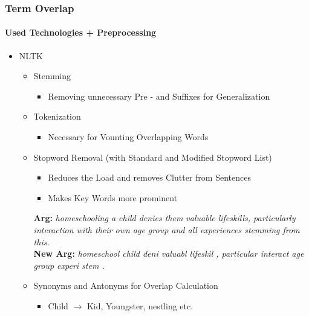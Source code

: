 \documentclass[english,handout]{mlutalk}
\begin{document}
\begin{frame}
  \frametitle{Term Overlap}
  \framesubtitle{Used Technologies + Preprocessing}
    \begin{itemize}
      \item NLTK 
        \begin{itemize}
          \item Stemming
          \begin{itemize}
            \item Removing unnecessary Pre - and Suffixes for Generalization
          \end{itemize}
          \item Tokenization
          \begin{itemize}
            \item Necessary for Vounting Overlapping Words
          \end{itemize}
          \item Stopword Removal (with Standard and Modified Stopword List)
          \begin{itemize}
            \item Reduces the Load and removes Clutter from Sentences
            \item Makes Key Words more prominent
          \end{itemize}
          
          \begin{example}
            \textbf{Arg:} \textit{homeschooling a child denies them valuable lifeskills, particularly interaction with their own age group and all experiences stemming from this.}\\
            \textbf{New Arg:} \textit{homeschool child deni valuabl lifeskil , particular interact age group experi stem .}
          \end{example}

          \item Synonyms and Antonyms for Overlap Calculation
          \begin{itemize}
            \item Child $\rightarrow$ Kid, Youngster, nestling etc.
          \end{itemize}
        \end{itemize}
    \end{itemize}
    
\end{frame}
\end{document}
